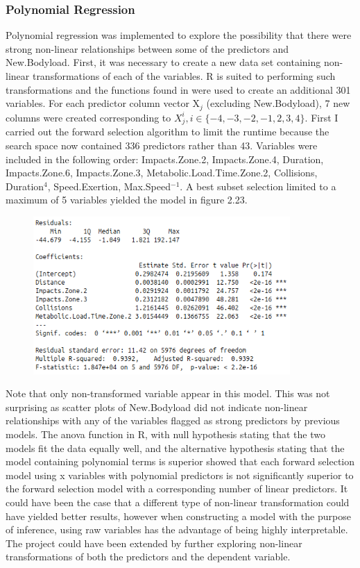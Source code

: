 \subsubsection{Polynomial Regression}
Polynomial regression was implemented to explore the possibility that there were strong non-linear relationships between some of the predictors and New.Bodyload. First, it was necessary to create a new data set containing non-linear transformations of each of the variables. R is suited to performing such transformations and the functions found in \cite{ModellingWithOutliers}  were used to create an additional 301 variables. For each predictor column vector X$_j$ (excluding New.Bodyload), 7 new columns were created corresponding to $X_j^i, i \in \{-4,-3,-2,-1,2,3,4\}$. First I carried out the forward selection algorithm to limit the runtime because the search space now contained 336 predictors rather than 43. Variables were included in the following order: Impacts.Zone.2, Impacts.Zone.4, Duration, Impacts.Zone.6, Impacts.Zone.3, Metabolic.Load.Time.Zone.2, Collisions,  Duration$^4$, Speed.Exertion, Max.Speed$^{-1}$. A best subset selection limited to a maximum of 5 variables yielded the model in figure 2.23.
\begin{figure}[h]
	\centering
	\includegraphics[width=.6\linewidth, height=6cm]{Images/PolynomialBestSubset.png}
\end{figure}
\hfill\break
\newline
Note that only non-transformed variable appear in this model. This was not surprising as scatter plots of New.Bodyload did not indicate non-linear relationships with any of the variables flagged as strong predictors by previous models. The anova function in R, with null hypothesis stating that the two models
fit the data equally well, and the alternative hypothesis stating that the model containing polynomial terms is superior showed that each forward selection model using x variables with polynomial predictors is not significantly superior to the forward selection model with a corresponding number of linear predictors. It could have been the case that a different type of non-linear transformation could have yielded better results, however when constructing a model with the purpose of inference, using raw variables has the advantage of being highly interpretable. The project could have been extended by further exploring non-linear transformations of both the predictors and the dependent variable.

